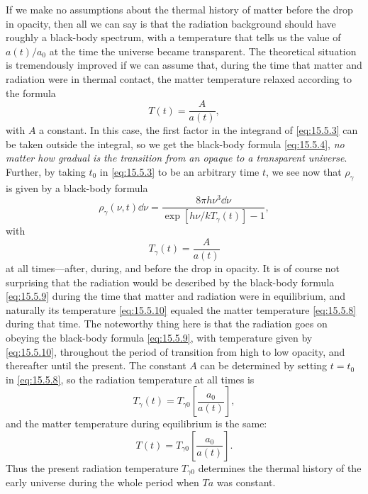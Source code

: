 If we make no assumptions about the thermal history of matter before the drop
in opacity, then all we can say is that the radiation background should have
roughly a black-body spectrum, with a temperature that tells us the value of
\(a(t)/a_0\) at the time the universe became transparent. The theoretical
situation is tremendously improved if we can assume that, during the time that
matter and radiation were in thermal contact, the matter temperature relaxed
according to the formula
\begin{equation}
  T(t)=\frac{A}{a(t)},
  \tag{15.5.8}\label{eq:15.5.8}
\end{equation}
with \(A\) a constant. In this case, the first factor in the integrand of
\eqref{eq:15.5.3} can be taken outside the integral, so we get the black-body
formula \eqref{eq:15.5.4}, \emph{no matter how gradual is the transition from
an opaque to a transparent universe}. Further, by taking \(t_0\) in
\eqref{eq:15.5.3} to be an arbitrary time \(t\), we see now that
\(\rho_\gamma\) is given by a black-body formula
\begin{equation}
  \rho_\gamma(\nu,t)\dd\nu
  =
  \frac{8\pi h\nu^3\dd\nu}
  {\exp[h\nu/kT_\gamma(t)]-1},
  \tag{15.5.9}\label{eq:15.5.9}
\end{equation}
with
\begin{equation}
  T_\gamma(t)=\frac{A}{a(t)}
  \tag{15.5.10}\label{eq:15.5.10}
\end{equation}
at all times---after, during, and before the drop in opacity. It is of course
not surprising that the radiation would be described by the black-body formula
\eqref{eq:15.5.9} during the time that matter and radiation were in
equilibrium, and naturally its temperature \eqref{eq:15.5.10} equaled the
matter temperature \eqref{eq:15.5.8} during that time. The noteworthy thing
here is that the radiation goes on obeying the black-body formula
\eqref{eq:15.5.9}, with temperature given by \eqref{eq:15.5.10},
throughout the period of transition from high to low opacity, and thereafter
until the present. The constant \(A\) can be determined by setting \(t=t_0\)
in \eqref{eq:15.5.8}, so the radiation temperature at all times is
\begin{equation}
  T_\gamma(t)=T_{\gamma0}\left[\frac{a_0}{a(t)}\right],
  \tag{15.5.11}\label{eq:15.5.11}
\end{equation}
and the matter temperature during equilibrium is the same:
\begin{equation}
  T(t)=T_{\gamma0}\left[\frac{a_0}{a(t)}\right].
  \tag{15.5.12}\label{eq:15.5.12}
\end{equation}
Thus the present radiation temperature \(T_{\gamma0}\) determines the thermal
history of the early universe during the whole period when \(Ta\) was constant.

